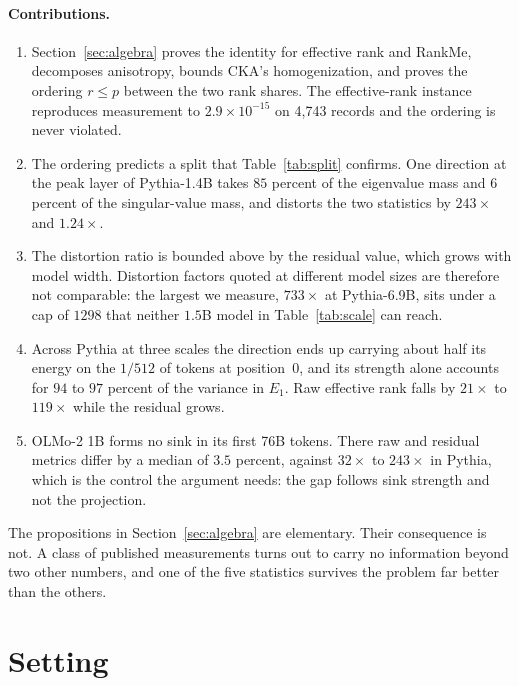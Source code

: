 \documentclass{article}
\theoremstyle{spaced}
\theoremstyle{definition}
\begin{document}
\paragraph{Contributions.}
\begin{enumerate}[leftmargin=1.4em,itemsep=1pt,topsep=2pt]
\item Section~\ref{sec:algebra} proves the identity for effective rank and RankMe, decomposes anisotropy, bounds CKA's homogenization, and proves the ordering $r \le p$ between the two rank shares. The effective-rank instance reproduces measurement to $2.9\times10^{-15}$ on 4{,}743 records and the ordering is never violated.
\item The ordering predicts a split that Table~\ref{tab:split} confirms. One direction at the peak layer of Pythia-1.4B takes $85$ percent of the eigenvalue mass and $6$ percent of the singular-value mass, and distorts the two statistics by $243\times$ and $1.24\times$.
\item The distortion ratio is bounded above by the residual value, which grows with model width. Distortion factors quoted at different model sizes are therefore not comparable: the largest we measure, $733\times$ at Pythia-6.9B, sits under a cap of $1298$ that neither $1.5$B model in Table~\ref{tab:scale} can reach.
\item Across Pythia at three scales the direction ends up carrying about half its energy on the $1/512$ of tokens at position~0, and its strength alone accounts for $94$ to $97$ percent of the variance in $E_1$. Raw effective rank falls by $21\times$ to $119\times$ while the residual grows.
\item OLMo-2 1B forms no sink in its first 76B tokens. There raw and residual metrics differ by a median of $3.5$ percent, against $32\times$ to $243\times$ in Pythia, which is the control the argument needs: the gap follows sink strength and not the projection.
\end{enumerate}

The propositions in Section~\ref{sec:algebra} are elementary. Their consequence is not. A class of published measurements turns out to carry no information beyond two other numbers, and one of the five statistics survives the problem far better than the others.

\section{Setting}
\label{sec:setting}
\end{document}
